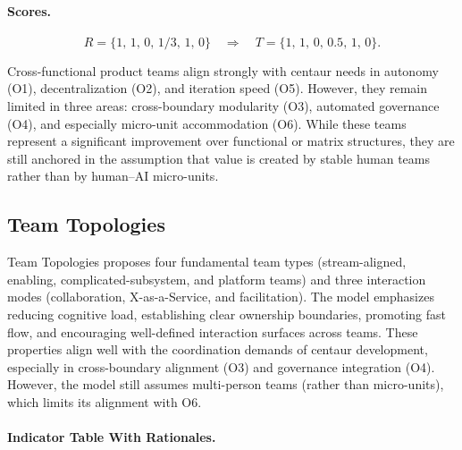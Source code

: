 \documentclass[11pt, a4paper, twocolumn]{article} %
\begin{document}
\paragraph{Scores.}

\[
R = \{1,\,1,\,0,\,1/3,\,1,\,0\}
\quad\Rightarrow\quad
T = \{1,\,1,\,0,\,0.5,\,1,\,0\}.
\]

Cross-functional product teams align strongly with centaur needs in autonomy
(O1), decentralization (O2), and iteration speed (O5). However, they remain
limited in three areas: cross-boundary modularity (O3), automated governance
(O4), and especially micro-unit accommodation (O6). While these teams represent
a significant improvement over functional or matrix structures, they are still
anchored in the assumption that value is created by stable human teams rather
than by human–AI micro-units.

\newpage
\subsection*{Team Topologies}

Team Topologies \citep{teamtopologies} proposes four fundamental team types
(stream-aligned, enabling, complicated-subsystem, and platform teams) and three
interaction modes (collaboration, X-as-a-Service, and facilitation). The model
emphasizes reducing cognitive load, establishing clear ownership boundaries,
promoting fast flow, and encouraging well-defined interaction surfaces across
teams. These properties align well with the coordination demands of centaur
development, especially in cross-boundary alignment (O3) and governance
integration (O4). However, the model still assumes multi-person teams (rather
than micro-units), which limits its alignment with O6.

\paragraph{Indicator Table With Rationales.}
\end{document}
